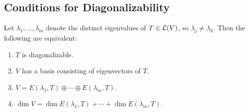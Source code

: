 \subsection{Conditions for Diagonalizability}
\setcounter{thm}{54}
\begin{thm} 
  \label{thm: conditions equivalent to diagonalizability}
  Let $\lambda_1, \dots,\lambda_m$ denote the distinct eigenvalues of $T\in \mathcal{L} (V)$, so $\lambda_j \neq \lambda_k$. Then the following are equivalent:
  \begin{enumerate}[label=(\alph*)]
    \item $T$ is diagonalizable.
    \item $V$ has a basis consisting of eigenvectors of $T$.
    \item $V=E(\lambda_1, T) \oplus \cdots \oplus E(\lambda_m, T).$
    \item $\dim V = \dim E(\lambda_1, T) + \cdots + \dim E(\lambda_m, T)$.
  \end{enumerate}
\end{thm}

